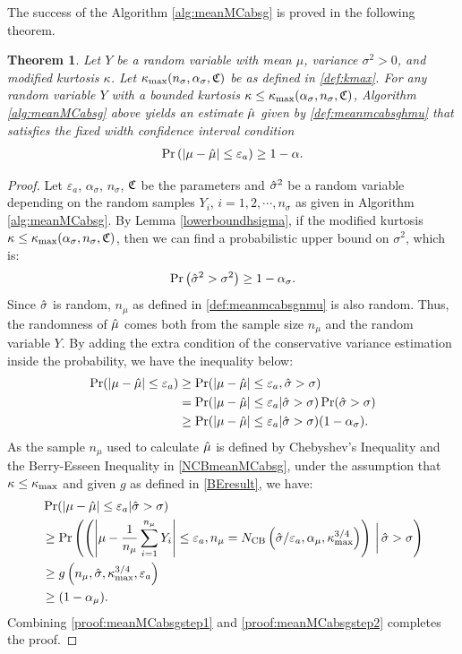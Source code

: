 \documentclass{iitthesis}
\newtheorem{theorem}{Theorem}[section]
\theoremstyle{definition}
\begin{document}
The success of the Algorithm \ref{alg:meanMCabsg} is proved in the following theorem.
\begin{theorem}\label{thm:meanMCabsg}
Let $Y$ be a random variable with mean $\mu$, variance $\sigma^2 >0$, and modified kurtosis $\kappa$. Let $\kappa_{\max}(n_\sigma,\alpha_\sigma,\mathfrak{C})$ be as defined in \eqref{def:kmax}. For any random variable $Y$ with a bounded kurtosis $\kappa\leq\kappa_{\max}(\alpha_{\sigma},n_{\sigma},\mathfrak{C})$, Algorithm \ref{alg:meanMCabsg} above yields an estimate $\hat{\mu}$ given by \eqref{def:meanmcabsghmu} that satisfies the fixed width confidence interval condition
\begin{align}
\Pr\left( \left \lvert \mu-\hat{\mu} \right \rvert \leq \varepsilon_a \right) \geq 1-\alpha.
\end{align}
\end{theorem}
\begin{proof}
Let $\varepsilon_a$, $\alpha_\sigma$, $n_\sigma$, $\mathfrak{C}$ be the parameters and $\hat{\sigma}^2$ be a random variable depending on the random samples $Y_i$, $i = 1,2,\cdots, n_{\sigma}$ as given in Algorithm \ref{alg:meanMCabsg}. By Lemma \ref{lowerboundhsigma}, if the modified kurtosis $\kappa \leq \kappa_{\max}(\alpha_{\sigma},n_{\sigma},\mathfrak{C})$, then we can find a probabilistic upper bound on $\sigma^2$, which is:
$$\Pr \left(\hat{\sigma}^2 > \sigma^2\right)\geq 1-\alpha_{\sigma}.$$
Since $\hat{\sigma}$ is random, $n_\mu$ as defined in \eqref{def:meanmcabsgnmu} is also random. Thus, the randomness of $\hat{\mu}$ comes both from the sample size $n_\mu$ and the random variable $Y$. By adding the extra condition of the conservative variance estimation inside the probability, we have the inequality below:
\begin{align}
\Pr(\left \lvert \mu-\hat{\mu} \right \rvert \leq \varepsilon_a) &\geq  \Pr({\left \lvert \mu-\hat{\mu} \right \rvert \leq \varepsilon_a}, {\hat{\sigma} >\sigma}) \nonumber \\
&= \Pr(\left \lvert \mu-\hat{\mu} \right \rvert \leq \varepsilon_a |\hat{\sigma}>\sigma)\Pr(\hat{\sigma} >\sigma) \nonumber \\
&\geq \Pr(\left \lvert \mu-\hat{\mu} \right \rvert \leq \varepsilon_a |\hat{\sigma} > \sigma)(1-\alpha_\sigma)\label{proof:meanMCabsgstep1}.
\end{align}
As the sample $n_\mu$ used to calculate $\hat{\mu}$ is defined by Chebyshev's Inequality and the Berry-Esseen Inequality in \eqref{NCBmeanMCabsg}, under the assumption that $\kappa \leq \kappa_{\max}$ and given $g$ as defined in \eqref{BEresult}, we have:
\begin{align}
&\Pr(\left \lvert \mu-\hat{\mu} \right \rvert \leq \varepsilon_a|\hat{\sigma}>\sigma) \nonumber \\& \geq \Pr\left( \left({\left \lvert \mu-\frac{1}{n_\mu}\sum_{i=1}^{n_\mu} Y_i \right \rvert \leq \varepsilon_a},{n_\mu= N_{\text{CB}}\left(\hat{\sigma}/\varepsilon_a,\alpha_\mu, \kappa_{\max}^{3/4}\right)}\right)\,\bigg\vert \,\hat{\sigma}>\sigma\right) \nonumber \\&\geq g\left(n_\mu,\hat{\sigma}, \kappa_{\max}^{3/4}, \varepsilon_a\right) \nonumber  \\&\geq (1-\alpha_\mu) \label{proof:meanMCabsgstep2}.
\end{align}
Combining \eqref{proof:meanMCabsgstep1} and \eqref{proof:meanMCabsgstep2} completes the proof.
\end{proof}
\end{document}
